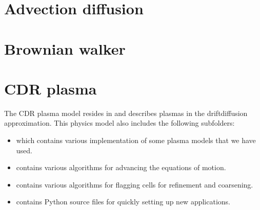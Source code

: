 \documentclass[letterpaper,10pt,english]{sphinxmanual}
\begin{document}
\sphinxstepscope


\section{Advection diffusion}
\label{\detokenize{Applications/AdvectionDiffusionModel:advection-diffusion}}\label{\detokenize{Applications/AdvectionDiffusionModel:chap-advectiondiffusionmodel}}\label{\detokenize{Applications/AdvectionDiffusionModel::doc}}
\sphinxstepscope


\section{Brownian walker}
\label{\detokenize{Applications/BrownianWalkerModel:brownian-walker}}\label{\detokenize{Applications/BrownianWalkerModel:chap-brownianwalkermodel}}\label{\detokenize{Applications/BrownianWalkerModel::doc}}
\sphinxstepscope


\section{CDR plasma}
\label{\detokenize{Applications/CdrPlasmaModel:cdr-plasma}}\label{\detokenize{Applications/CdrPlasmaModel:chap-cdrplasmamodel}}\label{\detokenize{Applications/CdrPlasmaModel::doc}}
\sphinxAtStartPar
The CDR plasma model resides in  and describes plasmas in the drift\sphinxhyphen{}diffusion approximation.
This physics model also includes the following subfolders:
\begin{itemize}
\item {} 
\sphinxAtStartPar
{} which contains various implementation of some plasma models that we have used.

\item {} 
\sphinxAtStartPar
{} contains various algorithms for advancing the equations of motion.

\item {} 
\sphinxAtStartPar
{} contains various algorithms for flagging cells for refinement and coarsening.

\item {} 
\sphinxAtStartPar
{} contains Python source files for quickly setting up new applications.

\end{itemize}
\end{document}
